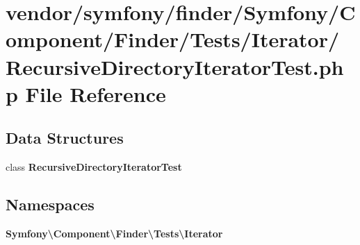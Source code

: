 \section{vendor/symfony/finder/\+Symfony/\+Component/\+Finder/\+Tests/\+Iterator/\+Recursive\+Directory\+Iterator\+Test.php File Reference}
\label{_recursive_directory_iterator_test_8php}
\subsection*{Data Structures}
\begin{DoxyCompactItemize}
\item 
class {\bf Recursive\+Directory\+Iterator\+Test}
\end{DoxyCompactItemize}
\subsection*{Namespaces}
\begin{DoxyCompactItemize}
\item 
 {\bf Symfony\textbackslash{}\+Component\textbackslash{}\+Finder\textbackslash{}\+Tests\textbackslash{}\+Iterator}
\end{DoxyCompactItemize}

